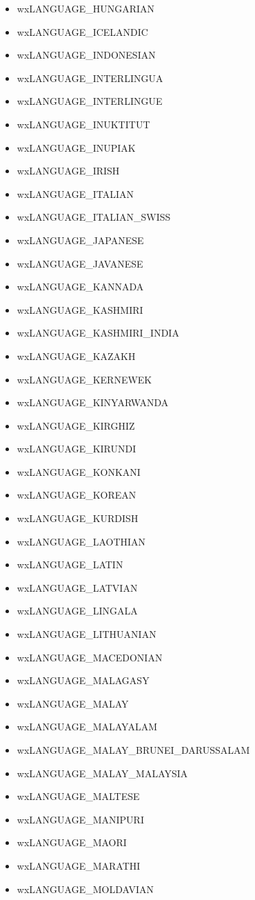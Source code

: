 \begin{itemize}
\item wxLANGUAGE\_HUNGARIAN
\item wxLANGUAGE\_ICELANDIC
\item wxLANGUAGE\_INDONESIAN
\item wxLANGUAGE\_INTERLINGUA
\item wxLANGUAGE\_INTERLINGUE
\item wxLANGUAGE\_INUKTITUT
\item wxLANGUAGE\_INUPIAK
\item wxLANGUAGE\_IRISH
\item wxLANGUAGE\_ITALIAN
\item wxLANGUAGE\_ITALIAN\_SWISS
\item wxLANGUAGE\_JAPANESE
\item wxLANGUAGE\_JAVANESE
\item wxLANGUAGE\_KANNADA
\item wxLANGUAGE\_KASHMIRI
\item wxLANGUAGE\_KASHMIRI\_INDIA
\item wxLANGUAGE\_KAZAKH
\item wxLANGUAGE\_KERNEWEK
\item wxLANGUAGE\_KINYARWANDA
\item wxLANGUAGE\_KIRGHIZ
\item wxLANGUAGE\_KIRUNDI
\item wxLANGUAGE\_KONKANI
\item wxLANGUAGE\_KOREAN
\item wxLANGUAGE\_KURDISH
\item wxLANGUAGE\_LAOTHIAN
\item wxLANGUAGE\_LATIN
\item wxLANGUAGE\_LATVIAN
\item wxLANGUAGE\_LINGALA
\item wxLANGUAGE\_LITHUANIAN
\item wxLANGUAGE\_MACEDONIAN
\item wxLANGUAGE\_MALAGASY
\item wxLANGUAGE\_MALAY
\item wxLANGUAGE\_MALAYALAM
\item wxLANGUAGE\_MALAY\_BRUNEI\_DARUSSALAM
\item wxLANGUAGE\_MALAY\_MALAYSIA
\item wxLANGUAGE\_MALTESE
\item wxLANGUAGE\_MANIPURI
\item wxLANGUAGE\_MAORI
\item wxLANGUAGE\_MARATHI
\item wxLANGUAGE\_MOLDAVIAN

\end{itemize}
